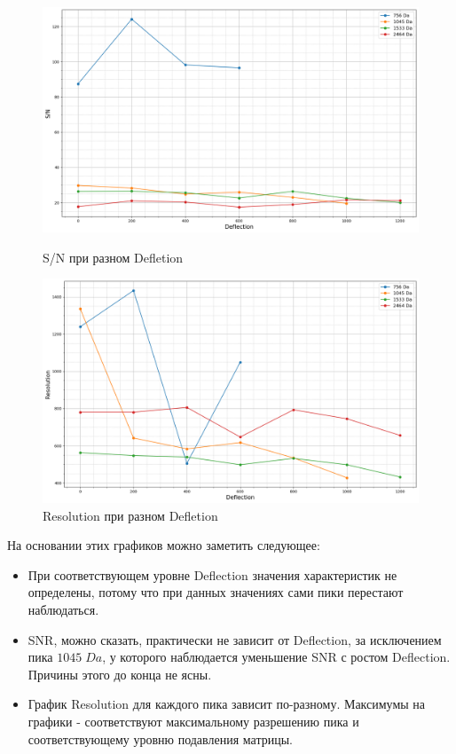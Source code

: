 \documentclass{article}
\begin{document}
\begin{figure}[h!] 
        \centering
        \centering
            \includegraphics[width=0.9\linewidth]{Images/SNR_deflection.png}
                 \caption{S/N при разном Defletion}
                 \label{SNR - deflection}
        \endminipage\hfill
        \centering
             \includegraphics[width=0.9\linewidth]{Images/Re_deflection.png}
                 \caption{Resolution при разном Defletion}
                 \label{Re - deflection}
        \endminipage
\end{figure}


На основании этих графиков можно заметить следующее:
\begin{itemize}
    \item При соответствующем уровне Deflection значения характеристик не определены, потому что при данных значениях сами пики перестают наблюдаться.
    \item SNR, можно сказать, практически не зависит от Deflection, за исключением пика $1045 \; Da$, у которого наблюдается уменьшение SNR с ростом Deflection. Причины этого до конца не ясны.
    \item График Resolution для каждого пика зависит по-разному. Максимумы на графики - соответствуют максимальному разрешению пика и соответствующему уровню подавления матрицы.
\end{itemize}
\end{document}
